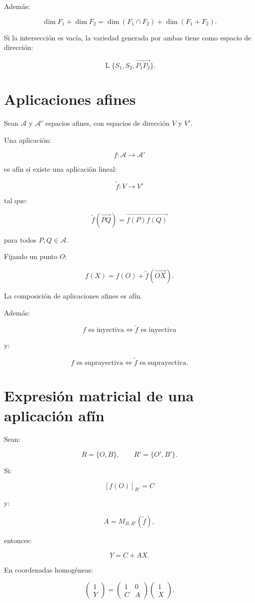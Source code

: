 \documentclass[11pt,a4paper]{article}
\newcommand{\Span}{\operatorname{L}}
\begin{document}
Además:

\[
\boxed{
\dim F_1+\dim F_2
=
\dim(F_1\cap F_2)+\dim(F_1+F_2).
}
\]

Si la intersección es vacía, la variedad generada por ambas tiene como espacio de dirección:

\[
\boxed{
\Span\{
S_1,S_2,\overrightarrow{P_1P_2}
\}.
}
\]

\section{Aplicaciones afines}

Sean $\mathcal A$ y $\mathcal A'$ espacios afines, con espacios de dirección $V$ y $V'$.

Una aplicación:

\[
f:\mathcal A\longrightarrow\mathcal A'
\]

es afín si existe una aplicación lineal:

\[
\widetilde f:V\longrightarrow V'
\]

tal que:

\[
\boxed{
\widetilde f(\overrightarrow{PQ})
=
\overrightarrow{f(P)f(Q)}
}
\]

para todos $P,Q\in\mathcal A$.

Fijando un punto $O$:

\[
\boxed{
f(X)=f(O)+\widetilde f(\overrightarrow{OX}).
}
\]

La composición de aplicaciones afines es afín.

Además:

\[
\boxed{
f\text{ es inyectiva}
\iff
\widetilde f\text{ es inyectiva}
}
\]

y:

\[
\boxed{
f\text{ es suprayectiva}
\iff
\widetilde f\text{ es suprayectiva}.
}
\]

\section{Expresión matricial de una aplicación afín}

Sean:

\[
R=\{O,B\},
\qquad
R'=\{O',B'\}.
\]

Si:

\[
[f(O)]_{R'}=C
\]

y:

\[
A=M_{B,B'}(\widetilde f),
\]

entonces:

\[
\boxed{
Y=C+AX.
}
\]

En coordenadas homogéneas:

\[
\boxed{
\begin{pmatrix}
1\\Y
\end{pmatrix}
=
\begin{pmatrix}
1&0\\
C&A
\end{pmatrix}
\begin{pmatrix}
1\\X
\end{pmatrix}.
}
\]
\end{document}
